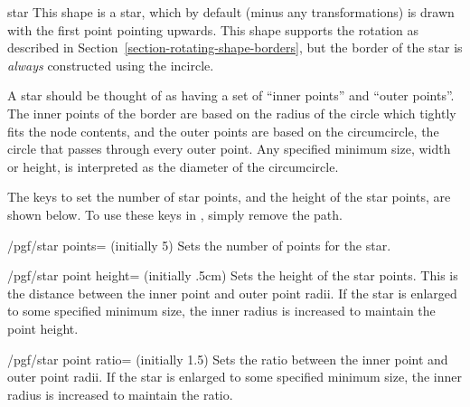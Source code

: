 \begin{shape}{star}
  This shape is a star, which by default (minus any transformations) is
  drawn with the first point pointing upwards.
  This shape supports the rotation as described in
  Section~\ref{section-rotating-shape-borders}, but the border of the
  star is \emph{always} constructed using the incircle.

  A star should be thought of as having a set of ``inner points''
  and ``outer points''.
  The inner points of the border are based on the radius of the circle
  which tightly fits the node contents, and the outer points are based
  on the circumcircle, the circle that passes through every outer
  point.
  Any specified minimum size, width or height, is interpreted as the
  diameter of the circumcircle.

\begin{codeexample}[]
\end{codeexample}

  The \pgfname{} keys to set the number of star points, and the height
  of the star points, are shown below. To use these keys in \tikzname,
  simply remove the  path.

  \begin{key}{/pgf/star points= (initially 5)}
    Sets the number of points for the star.
  \end{key}

  \begin{key}{/pgf/star point height= (initially .5cm)}
    Sets the height of the star points. This is the distance between the
    inner point and outer point radii. If the star is enlarged to some
    specified minimum size, the inner radius is increased to maintain
    the point height.	
  \end{key}

  \begin{key}{/pgf/star point ratio= (initially 1.5)}
    Sets the ratio between the inner point and outer point radii.		
    If the star is enlarged to some specified minimum size, the
    inner radius is increased to maintain the ratio.	
  \end{key}


\end{shape}
